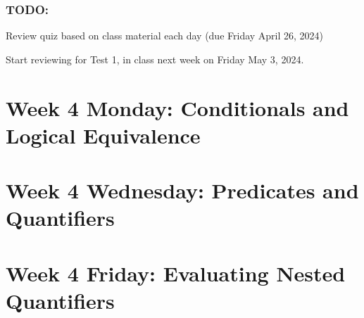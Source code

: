 \subsubsection*{TODO:}
\begin{list}
   {\itemsep2pt}
   \item Review quiz based on class material each day (due Friday April 26, 2024)
   \item Start reviewing for Test 1, in class next week on Friday May 3, 2024.
\end{list}

\newpage

\section*{Week 4 Monday: Conditionals and Logical Equivalence}



\vfill


\newpage

\newpage

\newpage

\newpage


\newpage


\section*{Week 4 Wednesday: Predicates and Quantifiers}


\vfill


\newpage

\vfill

\vfill

\vfill
\newpage


\newpage

\newpage

\section*{Week 4 Friday: Evaluating Nested Quantifiers}

\vfill

\vfill

\newpage

\newpage

